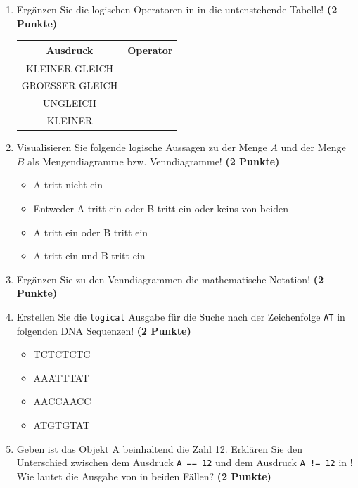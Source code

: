 \documentclass[a4paper, 10pt]{scrartcl}\usepackage[]{graphicx}\usepackage[]{xcolor}
\begin{document}
\begin{enumerate}
\item Erg{\"a}nzen Sie die logischen Operatoren in \Rlogo in die untenstehende Tabelle!
  \textbf{(2 Punkte)}
  \begin{center}
    \begin{tabular}{c|c}
      \textbf{Ausdruck} & \textbf{Operator} \strut\\ \hline
      KLEINER GLEICH  & \phantom{KLEINER GLEICH}\strut\\ \hline
      GROESSER GLEICH  & \phantom{GROESSER GLEICH}\strut\\ \hline
      UNGLEICH  & \phantom{UNGLEICH}\strut\\ \hline
      KLEINER  & \phantom{KLEINER}\strut\\ 
    \end{tabular}
  \end{center}  
\item Visualisieren Sie folgende logische Aussagen zu der Menge $A$ und der Menge
  $B$ als Mengendiagramme bzw. Venndiagramme!
  \textbf{(2 Punkte)}
  \begin{itemize}
  \item A tritt nicht ein
  \item Entweder A tritt ein oder B tritt ein oder keins von beiden
  \item A tritt ein oder B tritt ein
  \item A tritt ein und B tritt ein
  \end{itemize}
\item Erg{\"a}nzen Sie zu den Venndiagrammen die mathematische Notation!
  \textbf{(2 Punkte)}
\item Erstellen Sie die \texttt{logical} \Rlogo Ausgabe f{\"u}r die
  Suche nach der Zeichenfolge \texttt{AT} in folgenden DNA
  Sequenzen! \textbf{(2 Punkte)}
  \begin{itemize}
  \item TCTCTCTC
  \item AAATTTAT
  \item AACCAACC
  \item ATGTGTAT
  \end{itemize}
\item Geben ist das \Rlogo Objekt A beinhaltend die Zahl
  12. Erkl{\"a}ren Sie den Unterschied zwischen dem Ausdruck \texttt{A == 12}
  und dem Ausdruck \texttt{A != 12} in \Rlogo! Wie lautet die Ausgabe von \Rlogo
  in beiden F{\"a}llen? \textbf{(2 Punkte)}
\end{enumerate}




  
\clearpage
\end{document}
